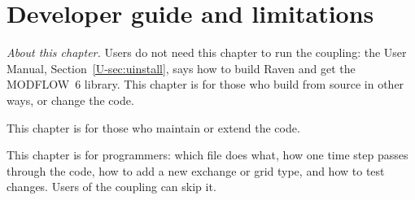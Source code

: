 \chapter{Developer guide and limitations}\label{ch:c9}\label{ch:dev}
\noindent\emph{About this chapter.} Users do not need this chapter to run the coupling: the User Manual,
Section~\ref{U-sec:uinstall}, says how to build Raven and get the MODFLOW~6 library. This chapter is for those who build
from source in other ways, or change the code.

This chapter is for those who maintain or extend the code.

\begin{plain}
This chapter is for programmers: which file does what, how one time step passes through the code, how to add a new
exchange or grid type, and how to test changes. Users of the coupling can skip it.
\end{plain}

